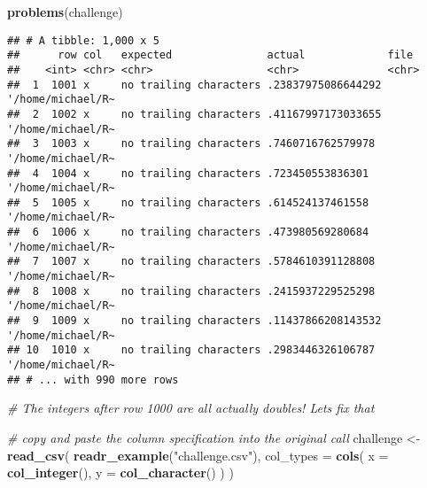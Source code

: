 \documentclass[]{article}
\newenvironment{Shaded}{\begin{snugshade}}{\end{snugshade}}
\newcommand{\KeywordTok}[1]{\textcolor[rgb]{0.13,0.29,0.53}{\textbf{#1}}}
\newcommand{\DataTypeTok}[1]{\textcolor[rgb]{0.13,0.29,0.53}{#1}}
\newcommand{\StringTok}[1]{\textcolor[rgb]{0.31,0.60,0.02}{#1}}
\newcommand{\CommentTok}[1]{\textcolor[rgb]{0.56,0.35,0.01}{\textit{#1}}}
\newcommand{\NormalTok}[1]{#1}
\begin{document}
\begin{Shaded}
\begin{Highlighting}[]
\KeywordTok{problems}\NormalTok{(challenge)}
\end{Highlighting}
\end{Shaded}

\begin{verbatim}
## # A tibble: 1,000 x 5
##      row col   expected               actual             file             
##    <int> <chr> <chr>                  <chr>              <chr>            
##  1  1001 x     no trailing characters .23837975086644292 '/home/michael/R~
##  2  1002 x     no trailing characters .41167997173033655 '/home/michael/R~
##  3  1003 x     no trailing characters .7460716762579978  '/home/michael/R~
##  4  1004 x     no trailing characters .723450553836301   '/home/michael/R~
##  5  1005 x     no trailing characters .614524137461558   '/home/michael/R~
##  6  1006 x     no trailing characters .473980569280684   '/home/michael/R~
##  7  1007 x     no trailing characters .5784610391128808  '/home/michael/R~
##  8  1008 x     no trailing characters .2415937229525298  '/home/michael/R~
##  9  1009 x     no trailing characters .11437866208143532 '/home/michael/R~
## 10  1010 x     no trailing characters .2983446326106787  '/home/michael/R~
## # ... with 990 more rows
\end{verbatim}

\begin{Shaded}
\begin{Highlighting}[]
\CommentTok{# The integers after row 1000 are all actually doubles! Lets fix that}

\CommentTok{# copy and paste the column specification into the original call}
\NormalTok{challenge <-}\StringTok{ }\KeywordTok{read_csv}\NormalTok{(}
  \KeywordTok{readr_example}\NormalTok{(}\StringTok{"challenge.csv"}\NormalTok{), }
  \DataTypeTok{col_types =} \KeywordTok{cols}\NormalTok{(}
    \DataTypeTok{x =} \KeywordTok{col_integer}\NormalTok{(),}
    \DataTypeTok{y =} \KeywordTok{col_character}\NormalTok{()}
\NormalTok{  )}
\NormalTok{)}
\end{Highlighting}
\end{Shaded}
\end{document}
